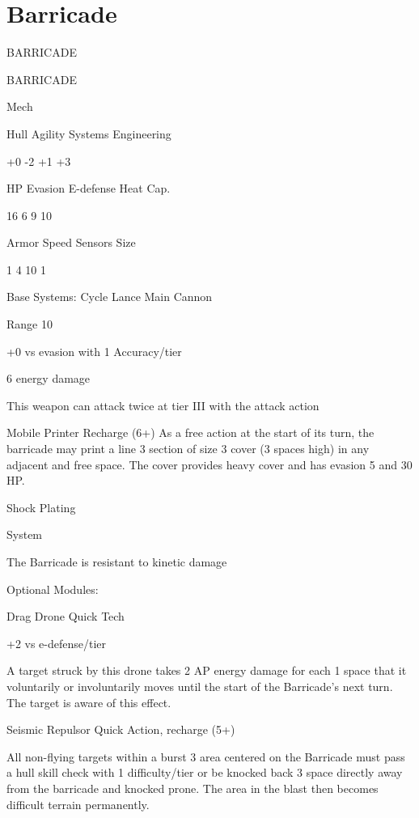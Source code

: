 \section{Barricade}
                                            BARRICADE

 BARRICADE

 Mech

 Hull       Agility     Systems       Engineering

 +0         -2          +1            +3

 HP         Evasion     E-defense     Heat Cap.

 16         6           9             10

 Armor      Speed       Sensors       Size

 1          4           10            1

Base Systems:
Cycle Lance
Main Cannon

Range 10

+0 vs evasion with 1 Accuracy/tier

6 energy damage

This weapon can attack twice at tier III with the attack action


Mobile Printer
Recharge (6+)
As a free action at the start of its turn, the barricade may print a line 3 section of size 3 cover (3
spaces high) in any adjacent and free space. The cover provides heavy cover and has evasion 5
and 30 HP.


Shock Plating

System

The Barricade is resistant to kinetic damage


Optional Modules:

Drag Drone
Quick Tech

+2 vs e-defense/tier

A target struck by this drone takes 2 AP energy damage for each 1 space that it voluntarily or
involuntarily moves until the start of the Barricade’s next turn. The target is aware of this effect.


Seismic Repulsor
Quick Action, recharge (5+)





All non-flying targets within a burst 3 area centered on the Barricade must pass a hull skill check
with 1 difficulty/tier or be knocked back 3 space directly away from the barricade and knocked
prone. The area in the blast then becomes difficult terrain permanently.


